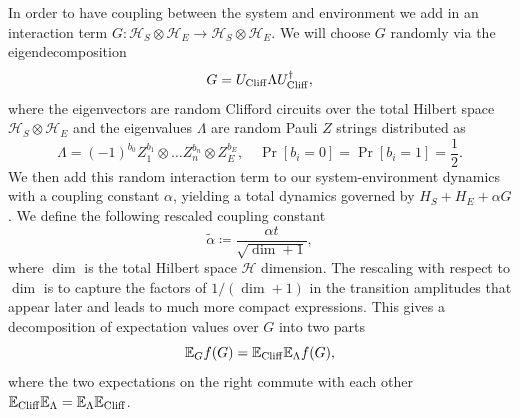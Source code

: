 \documentclass[
 amsmath,amssymb,
 aps,
onecolumn, 
nofootinbib]{revtex4-2}
\newcommand{\hilb}{\mathcal{H}}
\newcommand{\tp}{\otimes}
\begin{document}
In order to have coupling between the system and environment we add in an interaction term $G : \hilb_S \otimes \hilb_E \to \hilb_S \otimes \hilb_E$. We will choose $G$ randomly via the eigendecomposition 
\begin{equation}
    G = U_{\rm Cliff} \Lambda U_{\rm Cliff}^\dagger, \label{eq:interaction_def}
\end{equation}
where the eigenvectors are random Clifford circuits over the total Hilbert space $\hilb_S \tp \hilb_E$ and the eigenvalues $\Lambda$ are random Pauli $Z$ strings distributed as
\begin{equation}
    \Lambda = (-1)^{b_0} Z_1^{b_1} \tp \ldots Z_{n}^{b_n}  \tp Z_E^{b_E}, \quad \Pr[b_i = 0] = \Pr[b_i = 1] = \frac{1}{2}.
\end{equation}
We then add this random interaction term to our system-environment dynamics with a coupling constant $\alpha$, yielding a total dynamics governed by $H_S + H_E + \alpha G$. We define the following rescaled coupling constant 
 \begin{equation}
    \widetilde{\alpha} \coloneqq \frac{\alpha t}{\sqrt{\dim + 1}}, \label{eq:a_tilde_def}
\end{equation}
where $\dim$ is the total Hilbert space $\hilb$ dimension. The rescaling with respect to $\dim$ is to capture the factors of $1/(\dim + 1)$ in the transition amplitudes that appear later and leads to much more compact expressions.
This gives a decomposition of expectation values over $G$ into two parts 
\begin{equation}
    \mathbb{E}_G f(G) = \mathbb{E}_{\rm Cliff} \mathbb{E}_{\Lambda} f(G),
\end{equation}
where the two expectations on the right commute with each other $\mathbb{E}_{\rm Cliff} \mathbb{E}_{\Lambda} = \mathbb{E}_{\Lambda} \mathbb{E}_{\rm Cliff} $. 
\end{document}

